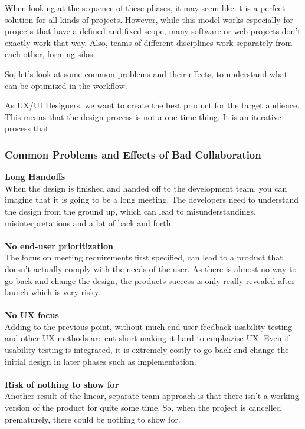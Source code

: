 When looking at the sequence of these phases, it may seem like it is a perfect solution for all kinds
of projects. However, while this model works especially for projects that have a defined and fixed
scope, many software or web projects don't exactly work that way. Also, teams of different
disciplines work separately from each other, forming silos.

So, let's look at some common problems and their effects, to understand what can be optimized in the
workflow.

As UX/UI Designers, we want to create the best product for the target audience. This means that the
design process is not a one-time thing. It is an iterative process that 

\subsubsection{Common Problems and Effects of Bad Collaboration}
\textbf{Long Handoffs} \\
When the design is finished and handed off to the development team, you can imagine that it is going
to be a long meeting. The developers need to understand the design from the ground up, which can
lead to misunderstandings, misinterpretations and a lot of back and forth.\\\\
\textbf{No end-user prioritization} \\
The focus on meeting requirements first specified, can lead to a product that doesn't actually comply
with the needs of the user. As there is almost no way to go back and change the design, the products
success is only really revealed after launch which is very risky.\\\\
\textbf{No UX focus} \\
Adding to the previous point, without much end-user feedback usability testing and other UX methods are
cut short making it hard to emphazise UX. Even if usability testing is integrated, it is extremely
costly to go back and change the initial design in later phases such as implementation.\\\\
\textbf{Risk of nothing to show for} \\
Another result of the linear, separate team approach is that there isn't a working version of the
product for quite some time. So, when the project is cancelled prematurely, there could be nothing
to show for.\\
